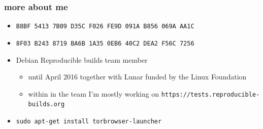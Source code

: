 \documentclass[14pt,aspectratio=169]{beamer}
\begin{document}
\begin{frame}
 \frametitle{more about me}

 \begin{itemize}
  \item \small{\texttt{B8BF 5413 7B09 D35C F026  FE9D 091A B856 069A AA1C}}
  \item \small{\texttt{8F03 B243 8719 BA6B 1A35  0EB6 40C2 DEA2 F56C 7256}}
  \item Debian Reproducible builds team member
  \begin{itemize}
   \item until April 2016 together with Lunar funded by the Linux Foundation
   \item within in the team I'm mostly working on
   \texttt{https://tests.reproducible-builds.org}
  \end{itemize}
  \item<2> \texttt{sudo apt-get install torbrowser-launcher}
\end{itemize}
\end{frame}
\end{document}
